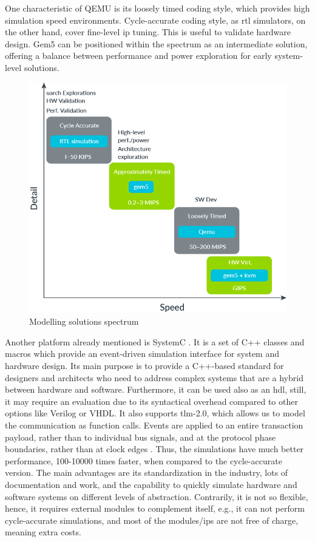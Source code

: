 One characteristic of QEMU is its loosely timed coding style, which provides high simulation speed environments. Cycle-accurate coding style, 
as \gls{rtl} simulators, on the other hand, cover fine-level \gls{ip} tuning. This is useful to validate hardware design. Gem5 can be positioned 
within the spectrum as an intermediate solution, offering a balance between performance and power exploration for early system-level solutions.

\begin{figure}[H]
	\centering
 	\includegraphics[width=0.6\linewidth]{Images/SimulationComparation.png}
 	\caption{ Modelling solutions spectrum \cite{herrera2020running}}
\end{figure}

Another platform already mentioned is SystemC \cite{systemC}. It is a set of C++ classes and macros which provide an event-driven simulation 
interface for system and hardware design. Its main purpose is to provide a C++-based standard for designers and architects who need to address 
complex systems that are a hybrid between hardware and software. Furthermore, it can be used also as an \gls{hdl}, still, it may require an 
evaluation due to its syntactical overhead compared to other options like Verilog or VHDL. It also supports \gls{tlm}-2.0, which allows us to 
model the communication as function calls. Events are applied to an entire transaction payload, rather than to individual bus signals, and at 
the protocol phase
boundaries, rather than at clock edges \cite{wieman2012overview}. Thus, the simulations have much better performance, 100-10000 times faster, 
when compared to the cycle-accurate version. The main advantages are its standardization in the industry, lots of documentation and work, and 
the capability to quickly simulate hardware and software systems on different levels of abstraction. Contrarily, it is not so flexible, hence, 
it requires external modules to complement itself, e.g., it can not perform cycle-accurate simulations, and most of the modules/\glspl{ip} are 
not free of charge, meaning extra costs. 


